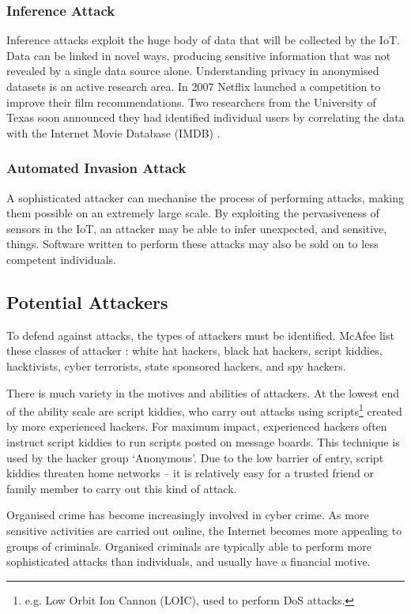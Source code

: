 \documentclass[10pt,journal,compsoc]{IEEEtran}
\begin{document}
\subsubsection{Inference Attack}
Inference attacks exploit the huge body of data that will be collected by the
IoT. Data can be linked in novel ways, producing sensitive information that was
not revealed by a single data source alone. Understanding privacy in anonymised
datasets is an active research area. In 2007 Netflix launched a competition to
improve their film recommendations. Two researchers from the University of
Texas soon announced they had identified individual users by correlating the
data with the Internet Movie Database (IMDB) \cite{Narayanan2008}.

\subsubsection{Automated Invasion Attack}
A sophisticated attacker can mechanise the process of performing attacks,
making them possible on an extremely large scale. By exploiting the
pervasiveness of sensors in the IoT, an attacker may be able to infer
unexpected, and sensitive, things. Software written to perform these attacks
may also be sold on to less competent individuals. 

\subsection{Potential Attackers}
To defend against attacks, the types of attackers must be identified. McAfee
list these classes of attacker \cite{McAfee2011}: white hat hackers, black hat
hackers, script kiddies, hacktivists, cyber terrorists, state sponsored
hackers, and spy hackers. 

There is much variety in the motives and abilities of attackers. At
the lowest end of the ability scale are script kiddies, who carry out attacks
using scripts\footnote{e.g. Low Orbit Ion Cannon (LOIC), used to perform DoS
attacks.} created by more experienced hackers. For maximum impact, experienced
hackers often instruct script kiddies to run scripts posted on message boards.
This technique is used by the hacker group `Anonymous'. Due to the low barrier
of entry, script kiddies threaten home networks -- it is relatively easy for a
trusted friend or family member to carry out this kind of attack. 

Organised crime has become increasingly involved in cyber crime. As more
sensitive activities are carried out online, the Internet becomes more
appealing to groups of criminals. Organised criminals are typically able to
perform more sophisticated attacks than individuals, and usually have a
financial motive. 
\end{document}
